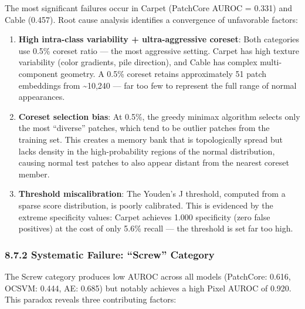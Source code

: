 The most significant failures occur in Carpet (PatchCore AUROC = 0.331) and Cable (0.457). Root cause analysis identifies a convergence of unfavorable factors:

\begin{enumerate}
\def\labelenumi{\arabic{enumi}.}
\item
  \textbf{High intra-class variability + ultra-aggressive coreset}: Both categories use 0.5\% coreset ratio --- the most aggressive setting. Carpet has high texture variability (color gradients, pile direction), and Cable has complex multi-component geometry. A 0.5\% coreset retains approximately 51 patch embeddings from \textasciitilde10,240 --- far too few to represent the full range of normal appearances.
\item
  \textbf{Coreset selection bias}: At 0.5\%, the greedy minimax algorithm selects only the most ``diverse'' patches, which tend to be outlier patches from the training set. This creates a memory bank that is topologically spread but lacks density in the high-probability regions of the normal distribution, causing normal test patches to also appear distant from the nearest coreset member.
\item
  \textbf{Threshold miscalibration}: The Youden's J threshold, computed from a sparse score distribution, is poorly calibrated. This is evidenced by the extreme specificity values: Carpet achieves 1.000 specificity (zero false positives) at the cost of only 5.6\% recall --- the threshold is set far too high.
\end{enumerate}

\subsubsection{8.7.2 Systematic Failure: ``Screw'' Category}\label{systematic-failure-screw-category}

The Screw category produces low AUROC across all models (PatchCore: 0.616, OCSVM: 0.444, AE: 0.685) but notably achieves a high Pixel AUROC of 0.920. This paradox reveals three contributing factors:

